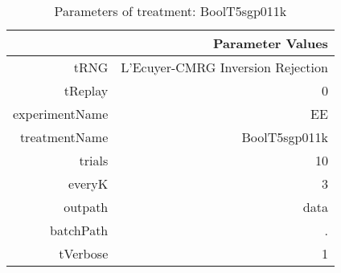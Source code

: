 \begin{table}[ht]
\centering
\begin{tabular}{rr}
  \hline
 & Parameter Values \\ 
  \hline
tRNG & L'Ecuyer-CMRG Inversion Rejection \\ 
  tReplay & 0 \\ 
  experimentName & EE \\ 
  treatmentName & BoolT5sgp011k \\ 
  trials & 10 \\ 
  everyK & 3 \\ 
  outpath & data \\ 
  batchPath & . \\ 
  tVerbose & 1 \\ 
   \hline
\end{tabular}
\caption{ Parameters of treatment: BoolT5sgp011k 
} 
\end{table}
